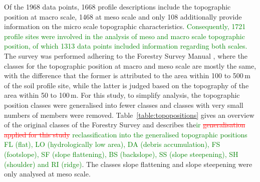 \documentclass[preprint,12pt,authoryear]{elsarticle}
\begin{document}
Of the 1968 data points, 1668 profile descriptions include  the topographic position at macro scale, 1468 at meso scale and only 108 additionally provide information on the micro scale topographic characteristics.  \textcolor{green}{Consequently, 1721 profile sites were involved in the analysis of meso and macro scale topographic position, of which 1313 data points included information regarding both scales.} The survey was performed adhering to the Forestry Survey Manual \citep{Englisch1998}, where the classes for the topographic position at macro and meso scale are mostly the same, with the difference that the former is attributed to the area within 100 to 500\,m of the soil profile site, while the latter is judged based on the topography of the area within 50 to 100\,m. For this study, to simplify  analysis, the topographic position classes were generalised into fewer classes and classes with very small numbers of members were removed. Table~\ref{table:topopositions} gives an overview of the original classes of the Forestry Survey and describes the\textcolor{green}{ir} \textcolor{red}{\sout{generalisation applied for this study}} \textcolor{green}{reclassification into the generalised topographic positions  FL (flat), LO (hydrologically low area), DA (debris accumulation), FS (footslope), SF (slope flattening), BS (backslope), SS (slope steepening), SH (shoulder) and RI (ridge)}. The classes slope flattening and slope steepening were only analysed at meso scale.
\end{document}
